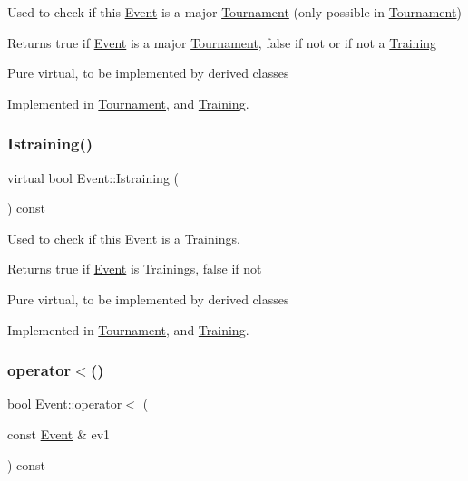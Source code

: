 Used to check if this \hyperlink{class_event}{Event} is a major \hyperlink{class_tournament}{Tournament} (only possible in \hyperlink{class_tournament}{Tournament}) 

\begin{DoxyReturn}{Returns}
true if \hyperlink{class_event}{Event} is a major \hyperlink{class_tournament}{Tournament}, false if not or if not a \hyperlink{class_training}{Training}
\end{DoxyReturn}
Pure virtual, to be implemented by derived classes 

Implemented in \hyperlink{class_tournament_af733baa05b3ae1465d6b5271929b5061}{Tournament}, and \hyperlink{class_training_aaf1c4d96664a16ca141dd5a3582f9426}{Training}.

\hypertarget{class_event_a08af9b350f32520dca26d552d6f415b2}{}\label{class_event_a08af9b350f32520dca26d552d6f415b2} 
\subsubsection{\texorpdfstring{Istraining()}{Istraining()}}
{\footnotesize\ttfamily virtual bool Event\+::\+Istraining (\begin{DoxyParamCaption}{ }\end{DoxyParamCaption}) const\hspace{0.3cm}{\ttfamily [pure virtual]}}



Used to check if this \hyperlink{class_event}{Event} is a Trainings. 

\begin{DoxyReturn}{Returns}
true if \hyperlink{class_event}{Event} is Trainings, false if not
\end{DoxyReturn}
Pure virtual, to be implemented by derived classes 

Implemented in \hyperlink{class_tournament_ab6fde765568ea9779fc10f0f2811c163}{Tournament}, and \hyperlink{class_training_ab70fe087f382d0de9dca69ce519be91e}{Training}.

\hypertarget{class_event_a7bdc01f67b0ebca8feb9650d63c8ff08}{}\label{class_event_a7bdc01f67b0ebca8feb9650d63c8ff08} 
\subsubsection{\texorpdfstring{operator$<$()}{operator<()}}
{\footnotesize\ttfamily bool Event\+::operator$<$ (\begin{DoxyParamCaption}\item[{const \hyperlink{class_event}{Event} \&}]{ev1 }\end{DoxyParamCaption}) const\hspace{0.3cm}{\ttfamily [inline]}}



